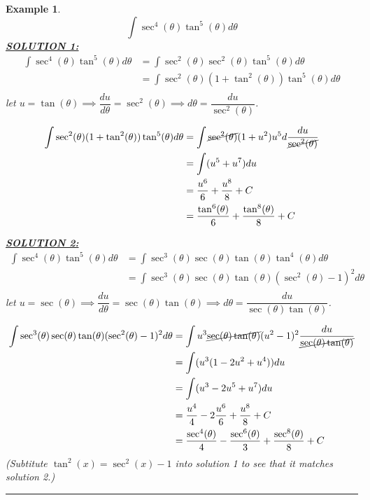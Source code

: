 \documentclass[reqno]{amsart}
\newtheorem{eg}[lem]{Example}
\numberwithin{equation}{section}
\begin{document}
\begin{eg} \[ \int \sec^4(\theta)\tan^5(\theta)d\theta \]
\underline{{\bf SOLUTION 1:}}
\begin{align*}
\int \sec^4(\theta)\tan^5(\theta)d\theta &= \int \sec^2(\theta)\sec^2(\theta)\tan^5(\theta)d\theta \\
&= \int \sec^2(\theta)(1+\tan^2(\theta))\tan^5(\theta)d\theta \\
\end{align*}
let $u=\tan(\theta) \implies \dfrac{du}{d\theta}=\sec^2(\theta) \implies d\theta = \dfrac{du}{\sec^2(\theta)}$.

\begin{align*}
\int \sec^2(\theta)(1+\tan^2(\theta))\tan^5(\theta)d\theta &= \int \cancel{\sec^2(\theta)}(1+u^2)u^5 d\dfrac{du}{\cancel{\sec^2(\theta)}}\\
&= \int (u^5+u^7) du\\
&= \frac{u^6}{6}+\frac{u^8}{8}+C\\
&= \frac{\tan^6(\theta)}{6}+\frac{\tan^8(\theta)}{8}+C
\end{align*}

\underline{{\bf SOLUTION 2:}}
\begin{align*}
\int \sec^4(\theta)\tan^5(\theta)d\theta &= \int \sec^3(\theta)\sec(\theta)\tan(\theta)\tan^4(\theta)d\theta \\
&= \int \sec^3(\theta)\sec(\theta)\tan(\theta)(\sec^2(\theta)-1)^2d\theta \\
\end{align*}
let $u=\sec(\theta) \implies \dfrac{du}{d\theta}=\sec(\theta)\tan(\theta) \implies d\theta = \dfrac{du}{\sec(\theta)\tan(\theta)}$.

\begin{align*}
\int \sec^3(\theta)\sec(\theta)\tan(\theta)(\sec^2(\theta)-1)^2d\theta  &= \int u^3\cancel{\sec(\theta)\tan(\theta)}(u^2-1)^2 \dfrac{du}{\cancel{\sec(\theta)\tan(\theta)}} \\
&= \int (u^3(1-2u^2+u^4)) du\\
&= \int (u^3-2u^5+u^7) du\\
&= \frac{u^4}{4}-2\frac{u^6}{6}+\frac{u^8}{8}+C\\
&= \frac{\sec^4(\theta)}{4}-\frac{\sec^6(\theta)}{3}+\frac{\sec^8(\theta)}{8}+C
\end{align*}
(Subtitute $\tan^2(x)=\sec^2(x)-1$ into solution 1 to see that it matches solution 2.)
\end{eg}

\hrule
\vspace{1pc}
\end{document}
